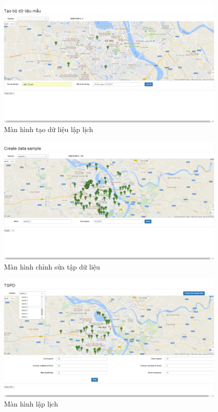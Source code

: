 \documentclass[a4paper,12pt]{report}
\begin{document}
\begin{figure}

\includegraphics[scale=0.41]{screen/makedata.png}
\caption{Màn hình tạo dữ liệu lập lịch}
\label{makedata}
\end{figure}
\begin{figure}

\includegraphics[scale=0.41]{screen/editdata.png}
\caption{Màn hình chỉnh sửa tập dữ liệu}
\label{editdata}
\end{figure}
\begin{figure}

\includegraphics[scale=0.41]{screen/laplich.png}
\caption{Màn hình lập lịch}
\label{laplich}
\end{figure}
\end{document}
